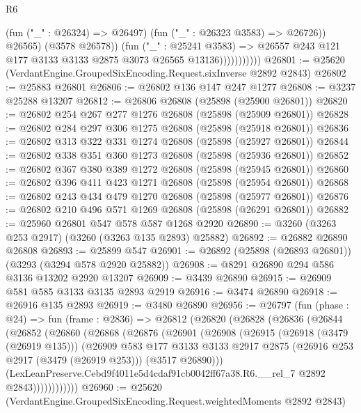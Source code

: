 \begin{lexlean}{R6}
\begin{coremodule}
                              (fun ("_" : @26324) => @26497)
                              (fun ("_" : @26323 @3583) => @26726))
                            @26565)
                          (@3578 @26578))
                        (fun ("_" : @25241 @3583) =>
                        @26557 @243 @121 @177 @3133 @3133 @2875 @3073 @26565 @13136)))))))))))
@26801 := @25620 (VerdantEngine.GroupedSixEncoding.Request.sixInverse @2892 @2843)
@26802 := @25883 @26801
@26806 := @26802 @136 @147 @247 @1277
@26808 := @3237 @25288 @13207
@26812 := @26806 @26808 (@25898 (@25900 @26801))
@26820 := @26802 @254 @267 @277 @1276 @26808 (@25898 (@25909 @26801))
@26828 := @26802 @284 @297 @306 @1275 @26808 (@25898 (@25918 @26801))
@26836 := @26802 @313 @322 @331 @1274 @26808 (@25898 (@25927 @26801))
@26844 := @26802 @338 @351 @360 @1273 @26808 (@25898 (@25936 @26801))
@26852 := @26802 @367 @380 @389 @1272 @26808 (@25898 (@25945 @26801))
@26860 := @26802 @396 @411 @423 @1271 @26808 (@25898 (@25954 @26801))
@26868 := @26802 @243 @434 @479 @1270 @26808 (@25898 (@25977 @26801))
@26876 := @26802 @210 @496 @571 @1269 @26808 (@25898 (@26291 @26801))
@26882 := @25960 @26801 @547 @578 @587 @1268 @2920
@26890 := @3260 (@3263 @253 @2917) (@3260 (@3263 @135 @2893) @25882)
@26892 := @26882 @26890 @26808
@26893 := @25899 @547
@26901 := @26892 (@25898 (@26893 @26801)) (@3293 (@3294 @578 @2920 @25882))
@26908 := @8291 @26890 @294 @586 @3136 @13202 @2920 @13207
@26909 := @3439 @26890
@26915 := @26909 @581 @585 @3133 @3135 @2893 @2919
@26916 := @3474 @26890
@26918 := @26916 @135 @2893
@26919 := @3480 @26890
@26956 := @26797
    (fun (phase : @24) =>
    fun (frame : @2836) =>
    @26812
      (@26820
        (@26828
          (@26836
            (@26844
              (@26852
                (@26860
                  (@26868
                    (@26876
                      (@26901
                        (@26908
                          (@26915
                            (@26918 (@3479 (@26919 @135)))
                            (@26909
                              @583
                              @177
                              @3133
                              @3133
                              @2917
                              @2875
                              (@26916 @253 @2917 (@3479 (@26919 @253)))
                              (@3517 @26890)))
                          (LexLeanPreserve.Cebd9f4011e5d4cdaf91cb0042ff67a38.R6.__rel_7
                            @2892
                            @2843))))))))))))
@26960 := @25620 (VerdantEngine.GroupedSixEncoding.Request.weightedMoments @2892 @2843)

\end{coremodule}
\end{lexlean}
